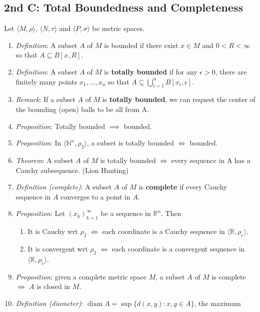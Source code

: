 \documentclass[10pt]{article}
\DeclareMathOperator{\diam}{diam}
\begin{document}
\begin{multicols*}{3}
	\section{2nd C: Total Boundedness and Completeness}
	Let \(\langle M,\rho\rangle\), \(\langle N,\tau\rangle\) and
	\(\langle P,\sigma\rangle\) be metric spaces.
	\begin{enumerate}
		\item \emph{Definition}: A subset \(A\) of \(M\) is bounded if there exist \(x \in M\) and \(0<R<\infty\)
		      so that \(A \subseteq B[x,R]\).
		\item \emph{Definition}: A subset \(A\) of \(M\) is \textbf{totally bounded} if for any
		      \(\epsilon > 0\), there are finitely many points \(x_1,\dots,x_n\) so that
		      \(A \subseteq \bigcup^n_{i=1}B[x_i,\epsilon]\).
		\item \emph{Remark}: If a subset \(A\) of \(M\) is \textbf{totally bounded}, we can request the
		      center of the bounding (open) balls to be all from A.
		\item \emph{Proposition}: Totally bounded \(\implies\) bounded.
		\item \emph{Proposition}: In \(\langle\mathbb{N}^n,\rho_2\rangle\), a subset is totally
		      bounded \(\iff\) bounded.
		\item \emph{Theorem}: A subset \(A\) of \(M\) is totally bounded \(\iff\) every sequence
		      in A has a Cauchy subsequence. (Lion Hunting)
		\item \emph{Definition (complete)}: A subset \(A\) of \(M\) is \textbf{complete} if every Cauchy
		      sequence in \(A\) converges to a point in \(A\).
		\item \emph{Proposition}: Let \((x_k)^\infty_{k=1}\) be a sequence in \(\mathbb{R}^n\).
		      Then
		      \begin{enumerate}
			      \item It is Cauchy wrt \(\rho_2\) \(\iff\) each coordinate is a Cauchy
			            sequence in \(\langle\mathbb{R},\rho_e\rangle\).
			      \item It is convergent wrt \(\rho_2\) \(\iff\) each coordinate is a convergent
			            sequence in \(\langle\mathbb{R},\rho_e\rangle\).
		      \end{enumerate}
		\item \emph{Proposition}: given a complete metric space \(M\), a subset \(A\) of \(M\)
		      is complete \(\iff\) \(A\) is closed in \(M\).
		\item \emph{Definition (diameter)}: \(\diam A = \sup\{d(x,y):x,y\in A\}\), the maximum

\end{enumerate}
\end{multicols*}
\end{document}

